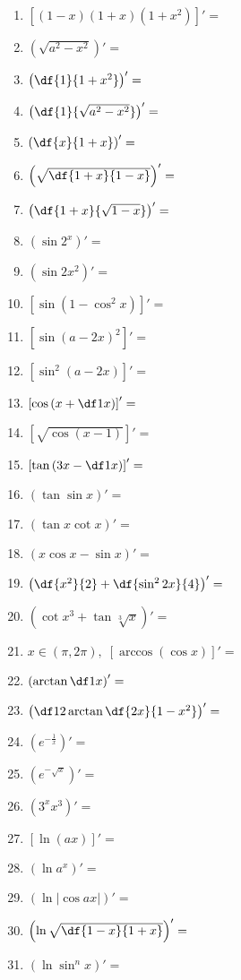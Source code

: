 \begin{enumerate}
  \item $[(1-x)(1+x)(1+x^2)]'=$%
  \item $\left(\sqrt{a^2-x^2}\right)'=$%
  \item $\left(\df{1}{1+x^2}\right)'=$
  \item $\left(\df{1}{\sqrt{a^2-x^2}}\right)'=$
  \item $\left(\df{x}{1+x}\right)'=$
  \item $\left(\sqrt{\df{1+x}{1-x}}\right)'=$
  \item $\left(\df{1+x}{\sqrt{1-x}}\right)'=$
  \item $(\sin 2^x)'=$
  \item $\left(\sin 2x^2\right)'=$
  \item $\left[\sin(1-\cos^2x)\right]'=$
  \item $\left[\sin(a-2x)^2\right]'=$
  \item $\left[\sin^2(a-2x)\right]'=$
  \item $\left[\cos\left(x+\df 1x\right)\right]'=$
  \item $\left[\sqrt{\cos(x-1)}\right]'=$
  \item $\left[\tan\left(3x-\df 1x\right)\right]'=$
  \item $\left(\tan\sin x\right)'=$
  \item $\left(\tan x\cot x\right)'=$
  \item $\left(x\cos x-\sin x\right)'=$
  \item $\left(\df {x^2}{2}+\df{\sin^2 2x}{4}\right)'=$
  \item $\left(\cot x^3+\tan\sqrt[3]x\right)'=$
  \item $x\in(\pi,2\pi),\;\left[\arccos(\cos x)\right]'=$
  \item $\left(\arctan\df1x\right)'=$
  \item $\left(\df12\arctan\df{2x}{1-x^2}\right)'=$
  \item $\left(e^{-\frac1x}\right)'=$
  \item $\left(e^{-\sqrt x}\right)'=$
  \item $\left(3^xx^3\right)'=$
  \item $\left[\ln (ax)\right]'=$
  \item $\left(\ln a^x\right)'=$
  \item $\left(\ln|\cos ax|\right)'=$
  \item $\left(\ln\sqrt{\df{1-x}{1+x}}\right)'=$
  \item $\left(\ln\sin^nx\right)'=$

\end{enumerate}
